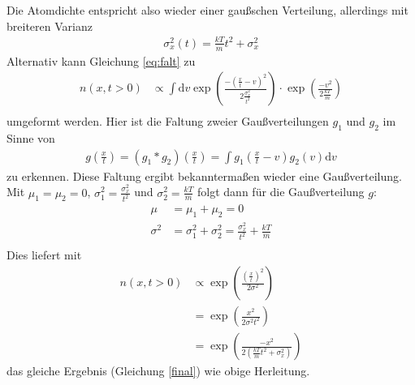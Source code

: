 \documentclass[10pt,a4paper]{extarticle}
\begin{document}
Die Atomdichte entspricht also wieder einer gaußschen Verteilung, allerdings mit breiteren Varianz
\begin{align}
\sigma_x^2 \left(t\right) = \frac{kT}{m}t^2 + \sigma_x^2 \label{final} 
\end{align}
Alternativ kann Gleichung \eqref{eq:falt} zu 
\begin{align}
n(x, t> 0) &\varpropto \int \mathrm{d}v \exp\left(\frac{-(\frac{x}{t}-v)^2}{2 \frac{\sigma_x^2}{t^2}}\right) \cdot \exp \left(\frac{-v^2}{2\frac{kT}{m}}\right) \\
\end{align}
umgeformt werden.
Hier ist die Faltung zweier Gaußverteilungen $g_1$ und $g_2$ im Sinne von
\begin{align}
g \left(\frac{x}{t}\right) = \left(g_1 * g_2\right) \left(\frac{x}{t}\right) = \int  g_1\left(\frac{x}{t}-v\right) g_2 \left(v\right)\mathrm{d}v
\end{align}
zu erkennen.
Diese Faltung ergibt bekanntermaßen wieder eine Gaußverteilung.
Mit $\mu_1 = \mu_2 = 0$, $\sigma_1^2 = \frac{\sigma_x^2}{t^2}$ und $\sigma_2^2 = \frac{kT}{m}$ folgt dann für die Gaußverteilung $g$:
\begin{align}
\mu &= \mu_1 + \mu_2 = 0 \\
\sigma^2 &= \sigma_1^2 + \sigma_2^2 =  \frac{\sigma_x^2}{t^2} + \frac{kT}{m}\\
\end{align}
Dies liefert mit 
\begin{align}
n(x, t> 0) &\varpropto \exp\left(\frac{\left(\frac{x}{t}\right)^2}{2 \sigma^2}\right) \\
&= \exp\left(\frac{x^2}{2 \sigma^2 t^2}\right) \\
&= \exp\left(\frac{- x^2 }{2\left(\frac{kT}{m}t^2 + \sigma_x^2\right)}\right) 
\end{align}
das gleiche Ergebnis (Gleichung \eqref{final}) wie obige Herleitung.
\end{document}
